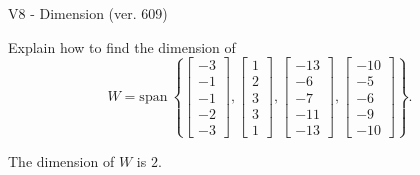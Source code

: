 \begin{exercise}
  \begin{exerciseTitle}V8 - Dimension (ver. 609)\end{exerciseTitle}
  \begin{exerciseStatement}
    Explain how to find the dimension of 
\[W=\mathrm{span}\ \left\{\left[\begin{array}{r}
-3 \\
-1 \\
-1 \\
-2 \\
-3
\end{array}\right] , \left[\begin{array}{r}
1 \\
2 \\
3 \\
3 \\
1
\end{array}\right] , \left[\begin{array}{r}
-13 \\
-6 \\
-7 \\
-11 \\
-13
\end{array}\right] , \left[\begin{array}{r}
-10 \\
-5 \\
-6 \\
-9 \\
-10
\end{array}\right]\right\}.\]



  \end{exerciseStatement}
  \begin{exerciseAnswer}
   The dimension of \(W\) is  \(2\).
  


  \end{exerciseAnswer}
\end{exercise}